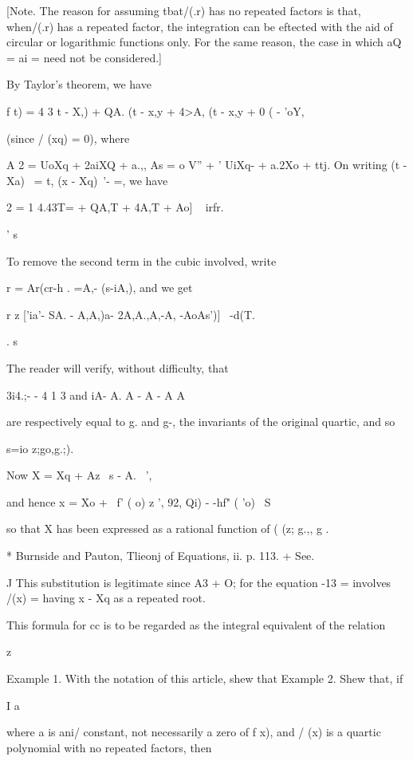 {[Note. The reason for assuming tbat/(.r) has no repeated factors is
that, when/(.r) has a repeated factor, the integration can be eftected
with the aid of circular or logarithmic functions only. For the same
reason, the case in which aQ = ai = need not be considered.]

By Taylor's theorem, we have

f t) = 4 3 t - X,) + QA. (t - x,y + 4>A, (t - x,y + 0 ( - 'oY,

(since / (xq) = 0), where

A 2 = UoXq + 2aiXQ + a.,, As = o V'' + ' UiXq- + a.2Xo + ttj. On
writing (t - Xa)~ = t, (x - Xq)~'- =, we have

2 = 1 4.43T= + QA,T + 4A,T + Ao] ~ irfr.

' s

To remove the second term in the cubic involved, write

r = Ar(cr-h . =A,- (s-iA,), and we get

r z ['ia'- SA. - A,A,)a- 2A,A.,A,-A, -AoAs')]~ -d(T.

. s

The reader will verify, without difficulty, that

3i4.;- - 4 1 3 and iA- A. A - A - A A

are respectively equal to g. and g-, the invariants of the original
quartic, and so

s=io z;go,g.;).

Now X = Xq + Az \ s - A. ~',

and hence x = Xo + \ f' ( o) z ', 92, Qi) - -hf" ( 'o) ~S

so that X has been expressed as a rational function of ( (z; g.,, g .

* Burnside and Pauton, Tlieonj of Equations, ii. p. 113. + See.

J This substitution is legitimate since A3 + O; for the equation -13 =
involves /(x) = having x - Xq as a repeated root.

%
%

This formula for cc is to be regarded as the integral equivalent of
the relation

z

Example 1. With the notation of this article, shew that Example 2.
Shew that, if

I a

where a is ani/ constant, not necessarily a zero of f x), and / (x) is
a quartic polynomial with no repeated factors, then

}
